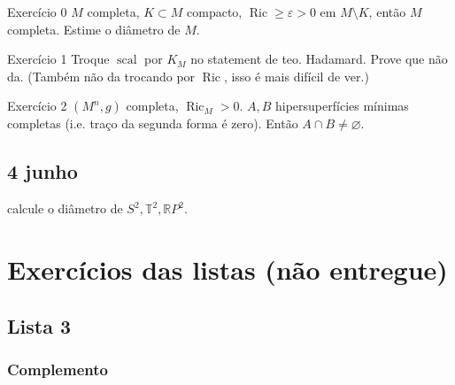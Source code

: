 \begin{thing6}{Exercício 0}\label{exer:0}\leavevmode
\(M\) completa, \(K \subset M\) compacto, \(\operatorname{Ric}\geq  \varepsilon>0\) em \(M\setminus K\), então \(M\) completa. Estime o diâmetro de \(M\).
\end{thing6}

\begin{thing6}{Exercício 1}\label{exer:1}\leavevmode
Troque \(\operatorname{s c a l}\) por \(K_M\) no statement de teo. Hadamard. Prove que não da. (Também não da trocando por \(\operatorname{Ric}\), isso é mais difícil de ver.)
\end{thing6}

\begin{thing6}{Exercício 2}\label{exer:2}\leavevmode
\((M^n,g)\) completa, \(\operatorname{Ric}_M>0\). \(A,B\) hipersuperfícies mínimas completas (i.e. traço da segunda forma é zero). Então \(A \cap B \neq  \varnothing\). 
\end{thing6}

\subsection{4 junho}

\begin{exercise}\leavevmode
calcule o diâmetro de \(S^2, \mathbb{T}^2,\mathbb{R}P^{2}\).
\end{exercise}

\clearpage
\section{Exercícios das listas (não entregue)}

\subsection{Lista 3}
\subsubsection{Complemento}

